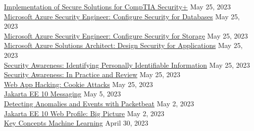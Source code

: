 \documentclass[10pt]{res} %
\begin{document}
\begin{resume}
\href{https://bjdelacruz.dev/files/certificates/pluralsight/Implementation_of_Secure_Solutions_for_CompTIA_Security.pdf}{\color{blue}Implementation of Secure Solutions for CompTIA Security+} \hfill May 25, 2023 \\
\href{https://bjdelacruz.dev/files/certificates/pluralsight/Microsoft_Azure_Security_Engineer_Configure_Security_for_Databases.pdf}{\color{blue}Microsoft Azure Security Engineer: Configure Security for Databases} \hfill May 25, 2023 \\
\href{https://bjdelacruz.dev/files/certificates/pluralsight/Microsoft_Azure_Security_Engineer_Configure_Security_for_Storage.pdf}{\color{blue}Microsoft Azure Security Engineer: Configure Security for Storage} \hfill May 25, 2023 \\
\href{https://bjdelacruz.dev/files/certificates/pluralsight/Microsoft_Azure_Solutions_Architect_Design_Security_for_Applications.pdf}{\color{blue}Microsoft Azure Solutions Architect: Design Security for Applications} \hfill May 25, 2023 \\
\href{https://bjdelacruz.dev/files/certificates/pluralsight/Security_Awareness_Identifying_Personally_Identifiable_Information.pdf}{\color{blue}Security Awareness: Identifying Personally Identifiable Information} \hfill May 25, 2023 \\
\href{https://bjdelacruz.dev/files/certificates/pluralsight/Security_Awareness_In_Practice_and_Review.pdf}{\color{blue}Security Awareness: In Practice and Review} \hfill May 25, 2023 \\
\href{https://bjdelacruz.dev/files/certificates/pluralsight/Web_App_Hacking_Cookie_Attacks.pdf}{\color{blue}Web App Hacking: Cookie Attacks} \hfill May 25, 2023 \\
\href{https://bjdelacruz.dev/files/certificates/pluralsight/Jakarta_EE_10_Messaging.pdf}{\color{blue}Jakarta EE 10 Messaging} \hfill May 5, 2023 \\
\href{https://bjdelacruz.dev/files/certificates/pluralsight/10_Detecting_Anomalies_and_Events_with_Packetbeat.pdf}{\color{blue}Detecting Anomalies and Events with Packetbeat} \hfill May 2, 2023 \\
\href{https://bjdelacruz.dev/files/certificates/pluralsight/Jakarta_EE_10_Web_Profile_Big_Picture.pdf}{\color{blue}Jakarta EE 10 Web Profile: Big Picture} \hfill May 2, 2023 \\
\href{https://bjdelacruz.dev/files/certificates/pluralsight/Key_Concepts_Machine_Learning.pdf}{\color{blue}Key Concepts Machine Learning} \hfill April 30, 2023 \\

\end{resume}
\end{document}
